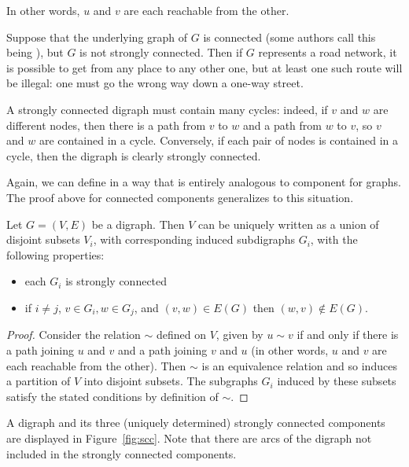 \begin{note}
In other words, $u$ and $v$ are each reachable from the other.

Suppose that the underlying graph of $G$ is connected (some authors call
this being ), but $G$ is not strongly
connected. Then if $G$ represents a road network, it is possible to get
from any place to any other one, but at least one such route will be
illegal: one must go the wrong way down a one-way street. \end{note}A
strongly connected digraph must contain many cycles: indeed, if $v$ and
$w$ are different nodes, then there is a path from $v$ to $w$ and a path
from $w$ to $v$, so $v$ and $w$ are contained in a cycle. Conversely, if
each pair of nodes is contained in a cycle, then the digraph is clearly
strongly connected.

Again, we can define  in a way that is entirely analogous to component for graphs. The proof above for connected components generalizes to this situation.

\begin{Theorem}
\label{thm:scc}
Let $G=(V, E)$ be a digraph. Then $V$ can be uniquely written as a union of disjoint subsets $V_i$, with corresponding induced subdigraphs $G_i$,  with the following properties:
\begin{itemize}
\item each $G_i$ is strongly connected
\item if $i\neq j$, $v\in G_i, w\in G_j$, and $(v, w) \in E(G)$ then $(w, v) \not\in E(G)$. 
\end{itemize}

\end{Theorem}

\begin{proof}
Consider the relation $\sim$ defined on $V$, given by $u\sim v$ if
and only if there is a path joining $u$ and $v$ and a path joining $v$ and $u$ (in other words, $u$ and $v$ are each reachable from the other). Then $\sim$ is an equivalence relation and so induces a partition of $V$ into disjoint subsets. The subgraphs $G_i$ induced by these subsets satisfy the stated conditions by definition of $\sim$.
\end{proof}



\begin{Example}\label{eg:scc}

A digraph and its three (uniquely determined) strongly connected
components are displayed in Figure~\ref{fig:scc}. Note that there are arcs of the digraph not included in the strongly connected components. 


\end{Example}


